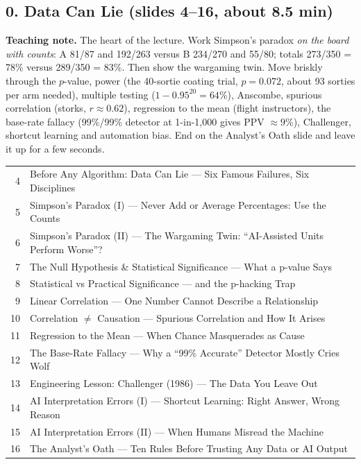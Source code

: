 \documentclass[11pt]{article}
\begin{document}
\subsection{0. Data Can Lie \normalfont\small\color{GreyN}(slides 4--16, about 8.5 min)}

\textbf{Teaching note.} The heart of the lecture. Work Simpson's paradox \emph{on the board with counts}: A 81/87 and 192/263 versus B 234/270 and 55/80; totals 273/350 = 78\% versus 289/350 = 83\%. Then show the wargaming twin. Move briskly through the $p$-value, power (the 40-sortie coating trial, $p=0.072$, about 93 sorties per arm needed), multiple testing ($1-0.95^{20}=64\%$), Anscombe, spurious correlation (storks, $r\approx0.62$), regression to the mean (flight instructors), the base-rate fallacy (99\%/99\% detector at 1-in-1,000 gives PPV $\approx9\%$), Challenger, shortcut learning and automation bias. End on the Analyst's Oath slide and leave it up for a few seconds.

\begin{center}\small\renewcommand{\arraystretch}{1.1}\begin{tabularx}{\textwidth}{@{}r X@{}}4 & Before Any Algorithm: Data Can Lie --- Six Famous Failures, Six Disciplines\\
5 & Simpson's Paradox (I) --- Never Add or Average Percentages: Use the Counts\\
6 & Simpson's Paradox (II) --- The Wargaming Twin: ``AI-Assisted Units Perform Worse''?\\
7 & The Null Hypothesis \& Statistical Significance --- What a p-value Says\\
8 & Statistical vs Practical Significance --- and the p-hacking Trap\\
9 & Linear Correlation --- One Number Cannot Describe a Relationship\\
10 & Correlation $\neq$ Causation --- Spurious Correlation and How It Arises\\
11 & Regression to the Mean --- When Chance Masquerades as Cause\\
12 & The Base-Rate Fallacy --- Why a ``99\% Accurate'' Detector Mostly Cries Wolf\\
13 & Engineering Lesson: Challenger (1986) --- The Data You Leave Out\\
14 & AI Interpretation Errors (I) --- Shortcut Learning: Right Answer, Wrong Reason\\
15 & AI Interpretation Errors (II) --- When Humans Misread the Machine\\
16 & The Analyst's Oath --- Ten Rules Before Trusting Any Data or AI Output\\\end{tabularx}\end{center}
\end{document}
